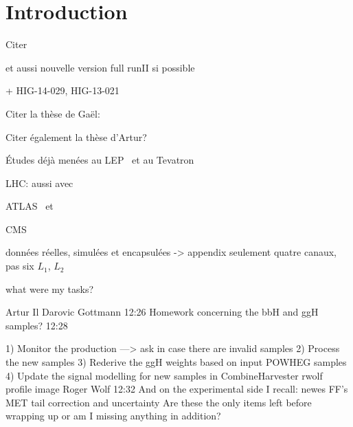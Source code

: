 \section{Introduction}\label{chapter-HTT_analysis-section-introduction}

Citer 

et aussi nouvelle version full runII si possible

+ HIG-14-029, HIG-13-021


Citer la thèse de Gaël:\\

Citer également la thèse d'Artur?\\


Études déjà menées au LEP~\cite{Schael:2006cr} et au Tevatron~\cite{Aaltonen:2009vf,Abazov:2011jh}

LHC: aussi avec \quarkb\antiquarkb~\cite{Chatrchyan:2013qga,Khachatryan:2015tra}

ATLAS \mu\mu\ et \tau\tau~\cite{Aad:2012cfr,ATLAS-MSSM-HTT_2018,ATLAS-MSSM-HTT_2020}

CMS \mu\mu~\cite{CMS:2015ooa} \tau\tau~\cite{Chatrchyan:2012vp,CMS-MSSM-HTT_2014,CMS-PAS-HIG-17-020}


données réelles, simulées et encapsulées  -> appendix
seulement quatre canaux, pas six
$L_1$, $L_2$

what were my tasks?

	
Artur Il Darovic Gottmann
12:26
Homework concerning the bbH and ggH samples?
12:28




1) Monitor the production ---> ask in case there are invalid samples
2) Process the new samples
3) Rederive the ggH weights based on input POWHEG samples
4) Update the signal modelling for new samples in CombineHarvester
rwolf profile image	
Roger Wolf
12:32
And on the experimental side I recall:
newes FF's
MET tail correction and uncertainty
Are these the only items left before wrapping up or am I missing anything in addition?